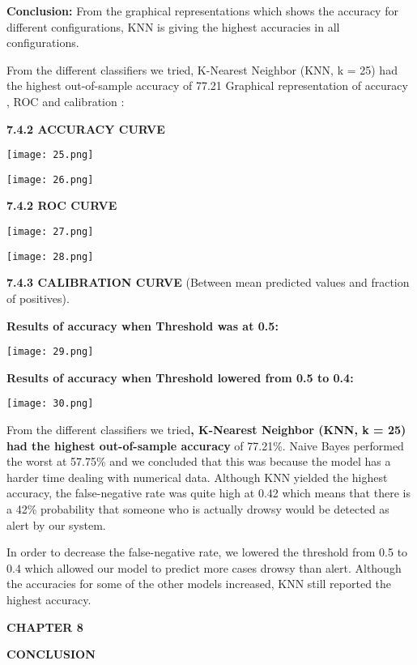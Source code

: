 \documentclass[a4paper,12pt]{article}
\begin{document}
\textbf{Conclusion:}
From the graphical representations which shows the accuracy for different configurations, KNN is giving the highest accuracies in all configurations.

From the different classifiers we tried, K-Nearest Neighbor (KNN, k = 25) had the highest out-of-sample accuracy of 77.21%
Graphical representation of accuracy , ROC and calibration :

\textbf{7.4.2 ACCURACY CURVE} 

\texttt{[image: 25.png]}

\texttt{[image: 26.png]}



\textbf{7.4.2 ROC CURVE}


\texttt{[image: 27.png]}

\texttt{[image: 28.png]}

\textbf{7.4.3 CALIBRATION CURVE} (Between mean predicted values and
fraction of positives).

\textbf{Results of accuracy when Threshold was at 0.5:}

\texttt{[image: 29.png]}

\textbf{Results of accuracy when Threshold lowered from 0.5 to 0.4:}

\texttt{[image: 30.png]}

From the different classifiers we tried\textbf{, K-Nearest Neighbor
(KNN, k = 25) had the highest out-of-sample accuracy} of 77.21\%. Naive
Bayes performed the worst at 57.75\% and we concluded that this was
because the model has a harder time dealing with numerical data.
Although KNN yielded the highest accuracy, the false-negative rate was
quite high at 0.42 which means that there is a 42\% probability that
someone who is actually drowsy would be detected as alert by our system.

In order to decrease the false-negative rate, we lowered the threshold
from 0.5 to 0.4 which allowed our model to predict more cases drowsy
than alert. Although the accuracies for some of the other models
increased, KNN still reported the highest accuracy.

\textbf{CHAPTER 8}

\textbf{CONCLUSION}
\end{document}
